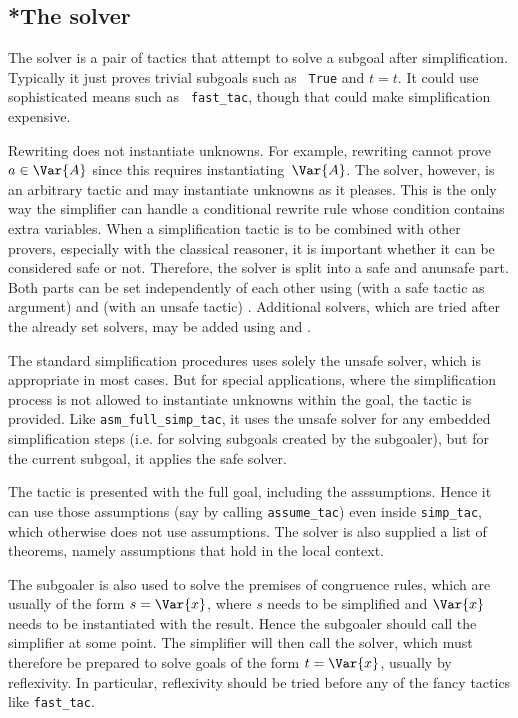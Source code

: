 \subsection{*The solver}\label{sec:simp-solver}
The solver is a pair of tactics that attempt to solve a subgoal after
simplification.  Typically it just proves trivial subgoals such as {\tt
  True} and $t=t$.  It could use sophisticated means such as {\tt
  fast_tac}, though that could make simplification expensive. 

Rewriting does not instantiate unknowns.  For example, rewriting cannot
prove $a\in \Var{A}$ since this requires instantiating~$\Var{A}$.  The
solver, however, is an arbitrary tactic and may instantiate unknowns as it
pleases.  This is the only way the simplifier can handle a conditional
rewrite rule whose condition contains extra variables. When a simplification 
tactic is to be combined with other provers, especially with the classical 
reasoner, it is important whether it can be considered safe or not. Therefore,
the solver is split into a safe and anunsafe part. Both parts can be set 
independently of each other using 
 (with a safe tactic as argument) and 
(with an unsafe tactic) . Additional solvers, which are tried after the already
set solvers, may be added using  and . 

The standard simplification procedures uses solely the unsafe solver, which is
appropriate in most cases. But for special applications, where the simplification
process is not allowed to instantiate unknowns within the goal, the tactic 
 is provided. Like {\tt asm_full_simp_tac}, 
it uses the unsafe solver for any embedded simplification steps 
(i.e. for solving subgoals created by the subgoaler), 
but for the current subgoal, it applies the safe solver.

The tactic is presented with the full goal, including the asssumptions.
Hence it can use those assumptions (say by calling {\tt assume_tac}) even
inside {\tt simp_tac}, which otherwise does not use assumptions.  The
solver is also supplied a list of theorems, namely assumptions that hold in
the local context.

The subgoaler is also used to solve the premises of congruence rules, which
are usually of the form $s = \Var{x}$, where $s$ needs to be simplified and
$\Var{x}$ needs to be instantiated with the result.  Hence the subgoaler
should call the simplifier at some point.  The simplifier will then call the
solver, which must therefore be prepared to solve goals of the form $t =
\Var{x}$, usually by reflexivity.  In particular, reflexivity should be
tried before any of the fancy tactics like {\tt fast_tac}.  

